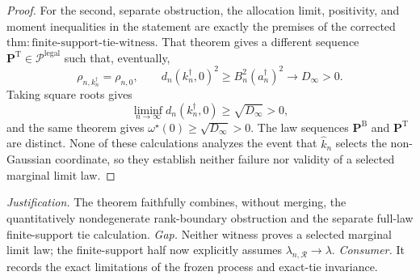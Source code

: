 \documentclass{article}
\begin{document}
\begin{proof}
For the second, separate obstruction, the allocation limit, positivity, and moment inequalities in the statement are exactly the premises of the corrected \(\mathrm{thm:finite\text{-}support\text{-}tie\text{-}witness}\).  That theorem gives a different sequence \(\mathbf P^{\mathrm T}\in\mathcal P^{\mathrm{legal}}\) such that, eventually,
\[
 \rho_{n,k_n^{\dagger}}=\rho_{n,0},
 \qquad
 d_n(k_n^{\dagger},0)^2
 \geq B_n^2(a_n^{\dagger})^2
 \longrightarrow D_\infty>0.
\]
Taking square roots gives
\[
 \liminf_{n\to\infty}d_n(k_n^{\dagger},0)
 \geq\sqrt{D_\infty}>0,
\]
and the same theorem gives \(\omega^{\star}(0)\geq\sqrt{D_\infty}>0\).  The law sequences \(\mathbf P^{\mathrm B}\) and \(\mathbf P^{\mathrm T}\) are distinct.  None of these calculations analyzes the event that \(\widehat k_n\) selects the non-Gaussian coordinate, so they establish neither failure nor validity of a selected marginal limit law.
\end{proof}
\par\smallskip\noindent \textit{Justification.} The theorem faithfully combines, without merging, the quantitatively nondegenerate rank-boundary obstruction and the separate full-law finite-support tie calculation. \textit{Gap.} Neither witness proves a selected marginal limit law; the finite-support half now explicitly assumes \(\lambda_{n,\mathcal R}\to\lambda\). \textit{Consumer.} It records the exact limitations of the frozen process and exact-tie invariance.
\end{document}
